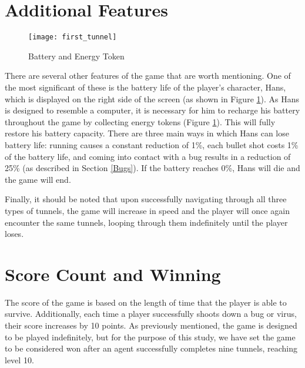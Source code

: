 \section{Additional Features}
\label{AdditionalFeatures}
\begin{figure}[h]
    \centering
    \texttt{[image: first\_tunnel]}
    \caption{Battery and Energy Token}
    \label{fig:batteryToken}
\end{figure}

There are several other features of the game that are worth mentioning. One of the most significant of these is the battery life of the player's character, Hans, which is displayed on the right side of the screen (as shown in Figure \ref{fig:batteryToken}). As Hans is designed to resemble a computer, it is necessary for him to recharge his battery throughout the game by collecting energy tokens (Figure \ref{fig:batteryToken}). This will fully restore his battery capacity. There are three main ways in which Hans can lose battery life: running causes a constant reduction of 1\%, each bullet shot costs 1\% of the battery life, and coming into contact with a bug results in a reduction of 25\% (as described in Section \ref{Bugs}). If the battery reaches 0\%, Hans will die and the game will end.

Finally, it should be noted that upon successfully navigating through all three types of tunnels, the game will increase in speed and the player will once again encounter the same tunnels, looping through them indefinitely until the player loses.

\section{Score Count and Winning}
The score of the game is based on the length of time that the player is able to survive. Additionally, each time a player successfully shoots down a bug or virus, their score increases by 10 points. As previously mentioned, the game is designed to be played indefinitely, but for the purpose of this study, we have set the game to be considered won after an agent successfully completes nine tunnels, reaching level 10.
